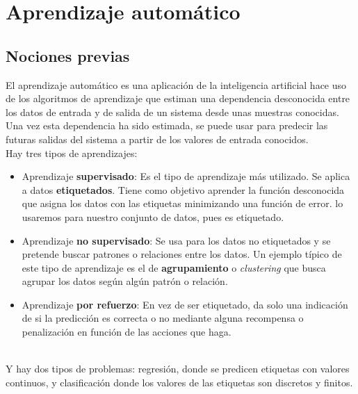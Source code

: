 

\chapter{Aprendizaje automático}\label{Aprendizaje}
\section{Nociones previas}
El aprendizaje automático es una aplicación de la inteligencia artificial hace uso de los algoritmos de aprendizaje que estiman una dependencia desconocida entre los datos de entrada y de salida de un sistema desde unas muestras conocidas. Una vez esta dependencia ha sido estimada, se puede usar para predecir las futuras salidas del sistema a partir de los valores de entrada conocidos.\\
Hay tres tipos de aprendizajes:
\begin{itemize}
  \item Aprendizaje \textbf{supervisado}: Es el tipo de aprendizaje más utilizado. Se aplica a datos \textbf{etiquetados}. Tiene como objetivo aprender la función desconocida que asigna los datos con las etiquetas minimizando una función de error. lo usaremos para nuestro conjunto de datos, pues es etiquetado.
  \item Aprendizaje \textbf{no supervisado}: Se usa para los datos no etiquetados y se pretende buscar patrones o relaciones entre los datos. Un ejemplo típico de este tipo de aprendizaje es el de \textbf{agrupamiento} o \textit{clustering} que busca agrupar los datos según algún patrón o relación.
  \item Aprendizaje \textbf{por refuerzo}: En vez de ser etiquetado, da solo una indicación de si la predicción es correcta o no mediante alguna recompensa o penalización en función de las acciones que haga.
\end{itemize}
\cite{jordan2015machine}\\
Y hay dos tipos de problemas: regresión, donde se predicen etiquetas con valores continuos, y clasificación donde los valores de las etiquetas son discretos y finitos.
